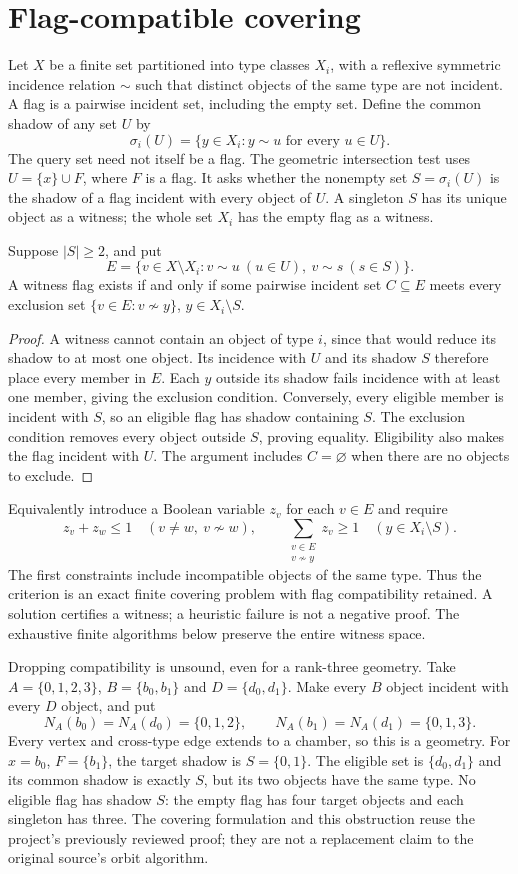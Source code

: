 \section{Flag-compatible covering}
Let $X$ be a finite set partitioned into type classes $X_i$, with a
reflexive symmetric incidence relation $\sim$ such that distinct objects
of the same type are not incident. A flag is a pairwise incident set,
including the empty set. Define the common shadow of any set $U$ by
\[
 \sigma_i(U)=\{y\in X_i:y\sim u\text{ for every }u\in U\}.
\]
The query set need not itself be a flag. The geometric intersection test
uses $U=\{x\}\cup F$, where $F$ is a flag. It asks whether the nonempty
set $S=\sigma_i(U)$ is the shadow of a flag incident with every object
of $U$. A singleton $S$ has its unique object as a witness; the whole
set $X_i$ has the empty flag as a witness.

\begin{theorem}\label{cover}
Suppose $|S|\geq2$, and put
\[
 E=\{v\in X\setminus X_i:v\sim u\ (u\in U),\ v\sim s\ (s\in S)\}.
\]
A witness flag exists if and only if some pairwise incident set $C\subseteq E$
meets every exclusion set
$\{v\in E:v\not\sim y\}$, $y\in X_i\setminus S$.
\end{theorem}
\begin{proof}
A witness cannot contain an object of type $i$, since that would reduce
its shadow to at most one object. Its incidence with $U$ and its shadow
$S$ therefore place every member in $E$. Each $y$ outside its shadow
fails incidence with at least one member, giving the exclusion condition.
Conversely, every eligible member is incident with $S$, so an eligible
flag has shadow containing $S$. The exclusion condition removes every
object outside $S$, proving equality. Eligibility also makes the flag
incident with $U$. The argument includes $C=\varnothing$ when there are
no objects to exclude.
\end{proof}
Equivalently introduce a Boolean variable $z_v$ for each $v\in E$ and
require
\[
 z_v+z_w\leq1\quad(v\ne w,\ v\not\sim w),\qquad
 \sum_{\substack{v\in E\\v\not\sim y}}z_v\geq1
       \quad(y\in X_i\setminus S).
\]
The first constraints include incompatible objects of the same type.
Thus the criterion is an exact finite covering problem with flag
compatibility retained. A solution certifies a witness; a heuristic
failure is not a negative proof. The exhaustive finite algorithms below
preserve the entire witness space.

Dropping compatibility is unsound, even for a rank-three geometry. Take
$A=\{0,1,2,3\}$, $B=\{b_0,b_1\}$ and $D=\{d_0,d_1\}$. Make every
$B$ object incident with every $D$ object, and put
\[
 N_A(b_0)=N_A(d_0)=\{0,1,2\},\qquad
 N_A(b_1)=N_A(d_1)=\{0,1,3\}.
\]
Every vertex and cross-type edge extends to a chamber, so this is a
geometry. For $x=b_0$, $F=\{b_1\}$, the target shadow is $S=\{0,1\}$.
The eligible set is $\{d_0,d_1\}$ and its common shadow is exactly $S$,
but its two objects have the same type. No eligible flag has shadow $S$:
the empty flag has four target objects and each singleton has three.
The covering formulation and this obstruction reuse the project's
previously reviewed proof; they are not a replacement claim to the
original source's orbit algorithm.
